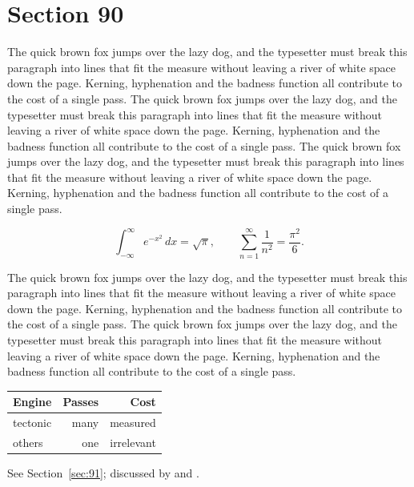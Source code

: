 \documentclass{article}
\begin{document}
\section{Section 90}
\label{sec:90}
The quick brown fox jumps over the lazy dog, and the typesetter must break this paragraph into lines that fit the measure without leaving a river of white space down the page. Kerning, hyphenation and the badness function all contribute to the cost of a single pass. The quick brown fox jumps over the lazy dog, and the typesetter must break this paragraph into lines that fit the measure without leaving a river of white space down the page. Kerning, hyphenation and the badness function all contribute to the cost of a single pass. The quick brown fox jumps over the lazy dog, and the typesetter must break this paragraph into lines that fit the measure without leaving a river of white space down the page. Kerning, hyphenation and the badness function all contribute to the cost of a single pass. 

\begin{equation}\label{eq:90}
\int_{-\infty}^{\infty} e^{-x^{2}}\,dx = \sqrt{\pi}, \qquad
\sum_{n=1}^{\infty} \frac{1}{n^{2}} = \frac{\pi^{2}}{6}.
\end{equation}

The quick brown fox jumps over the lazy dog, and the typesetter must break this paragraph into lines that fit the measure without leaving a river of white space down the page. Kerning, hyphenation and the badness function all contribute to the cost of a single pass. The quick brown fox jumps over the lazy dog, and the typesetter must break this paragraph into lines that fit the measure without leaving a river of white space down the page. Kerning, hyphenation and the badness function all contribute to the cost of a single pass. 

\begin{center}
\begin{tabular}{lrr}
\toprule
Engine & Passes & Cost \\
\midrule
tectonic & many & measured \\
others & one & irrelevant \\
\bottomrule
\end{tabular}
\end{center}

See Section~\ref{sec:91}; discussed by \textcite{k1} and \textcite{l3}.
\end{document}
